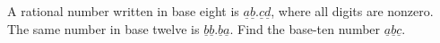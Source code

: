 A rational number written in base eight is $\underline{a} \underline{b} . \underline{c} \underline{d}$, where all digits are nonzero. The same number in base twelve is $\underline{b} \underline{b} . \underline{b} \underline{a}$. Find the base-ten number $\underline{a} \underline{b} \underline{c}$.